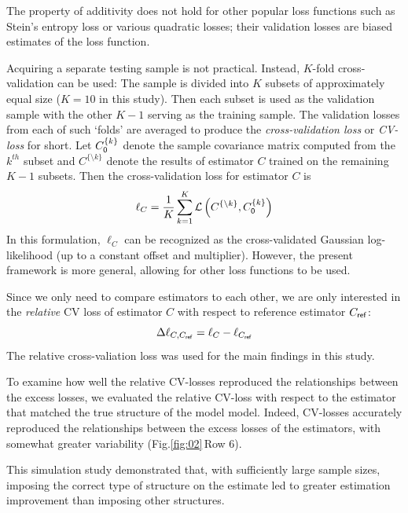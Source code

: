 \documentclass[10pt]{article}
\newcommand{\sq}[1]{\lq#1\rq}
\newcommand{\figref}[2]{Fig.\;\ref{fig:#1}\,#2}
\newcommand{\loss}[1]{\mathcal L\left(#1\right)}
\begin{document}
The property of additivity does not hold for other popular loss functions such as Stein's entropy loss or various quadratic losses; their validation losses are biased estimates of the loss function. 

Acquiring a separate testing sample is not practical. Instead, $K$-fold cross-validation can be used: The sample is divided into $K$ subsets of approximately equal size ($K=10$ in this study).  Then each subset is used as the validation sample with the other $K-1$ serving as the training sample. The validation losses from each of such \sq{folds} are averaged to produce the \emph{cross-validation loss} or \emph{CV-loss} for short.  Let $C_{\sf 0}^{\{k\}}$ denote the sample covariance matrix computed from the $k^{th}$ subset and $C^{\{\setminus k\}}$ denote the results of estimator $C$ trained on the remaining $K-1$ subsets. Then the cross-validation loss for estimator $C$ is
\begin{equation}\label{eq:cv-loss}
    \ell_C=\frac 1 K \sum\limits_{k=1}^K \loss{C^{\{\setminus k\}},C_{\sf 0}^{\{k\}}}
\end{equation}
In this formulation, $\ell_C$ can be recognized as the cross-validated Gaussian log-likelihood (up to a constant offset and multiplier). However, the present framework is more general, allowing for other loss functions to be used.

Since we only need to compare estimators to each other, we are only interested in the \emph{relative} CV loss of estimator $C$ with respect to reference estimator $C_{\sf ref}$:
\begin{equation}\label{eq:rel-cv-loss}
    \Delta\ell_{C,C_{\sf ref}} = \ell_{C}-\ell_{C_{\sf ref}}
\end{equation}
The relative cross-valiation loss was used for the main findings in this study. 

To examine how well the relative CV-losses reproduced the relationships between the excess losses, we evaluated the relative CV-loss with respect to the estimator that matched the true structure of the model model. Indeed, CV-losses accurately reproduced the relationships between the excess losses of the estimators, with somewhat greater variability (\figref{02}{Row 6}). 

This simulation study demonstrated that, with sufficiently large sample sizes, imposing the correct type of structure on the estimate led to greater estimation improvement than imposing other structures.
\end{document}
